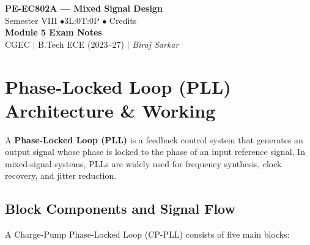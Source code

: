 \documentclass[12pt,a4paper]{article}
\begin{document}

\begin{center}
  {\LARGE\bfseries\color{myred} PE-EC802A --- Mixed Signal Design}\\[5pt]
  {\normalsize\color{mydark} Semester VIII \quad$\bullet$\quad 3L:0T:0P \quad$\bullet$ Credits}\\[3pt]
  {\normalsize\color{myteal}\textbf{Module 5 Exam Notes}}\\[3pt]
  {\small\color{mydark} CGEC \;$|$\; B.Tech ECE (2023--27) \;$|$\; \textit{Biraj Sarkar}}
\end{center}
\vspace{2pt}
\noindent{\color{myred}\rule{\linewidth}{1.5pt}}
\vspace{2pt}

\hypersetup{linkcolor=mydark}
\tableofcontents
\hypersetup{linkcolor=myteal}
\newpage

\section{Phase-Locked Loop (PLL) Architecture \& Working}

\begin{tcolorbox}[defbox, title={\textbf{Phase-Locked Loop (PLL) Concept}}]
A \textbf{Phase-Locked Loop (PLL)} is a feedback control system that generates an output signal whose phase is locked to the phase of an input reference signal. In mixed-signal systems, PLLs are widely used for frequency synthesis, clock recovery, and jitter reduction.
\end{tcolorbox}

\subsection{Block Components and Signal Flow}
A Charge-Pump Phase-Locked Loop (CP-PLL) consists of five main blocks:
\end{document}
